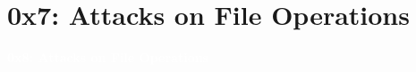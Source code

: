\documentclass[aspectratio=169]{beamer}
\begin{document}
\section{0x7: Attacks on File Operations}
{
\begin{frame}
\huge{\textcolor{white}{\textbf{0x8: Attacks on File Operations}}}
\end{frame}
}
\end{document}
